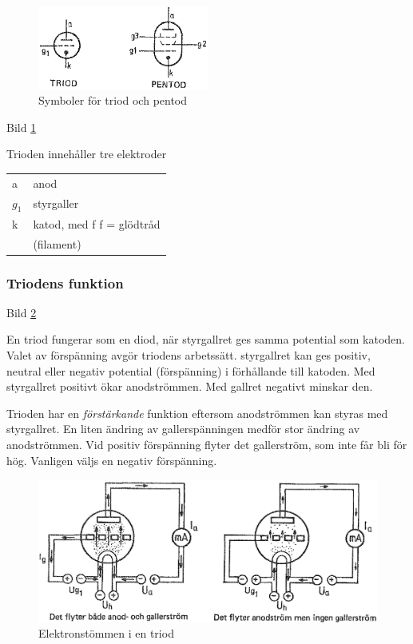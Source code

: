 \begin{figure}
\includegraphics[width=0.5\textwidth]{images/bild_2_2-30.png}
\caption{Symboler för triod och pentod}
\label{fig:BildII2-30}
\end{figure}

Bild \ref{fig:BildII2-30}

Trioden innehåller tre elektroder
\begin{tabular}{ll}
a & anod \\
\(g_1\) & styrgaller \\
k & katod, med f f = glödtråd \\
  & (filament) \\
\end{tabular}

\subsubsection{Triodens funktion}

Bild \ref{fig:BildII2-31}

En triod fungerar som en diod, när styrgallret ges samma potential som katoden.
Valet av förspänning avgör triodens arbetssätt. styrgallret kan ges positiv,
neutral eller negativ potential (förspänning) i förhållande till katoden. Med
styrgallret positivt ökar anodströmmen. Med gallret negativt minskar den.

Trioden har en \emph{förstärkande} funktion eftersom anodströmmen kan styras med
styrgallret. En liten ändring av gallerspänningen medför stor ändring av
anodströmmen. Vid positiv förspänning flyter det gallerström, som inte får bli
för hög. Vanligen väljs en negativ förspänning.

\begin{figure}[h]
\includegraphics[width=\textwidth]{images/bild_2_2-31.png}
\caption{Elektronstömmen i en triod}
\label{fig:BildII2-31}
\end{figure}

